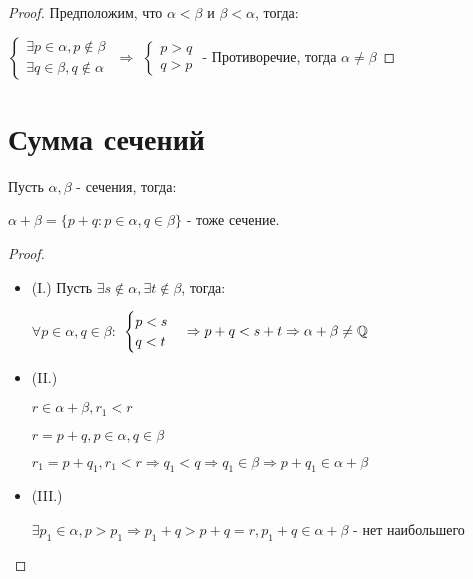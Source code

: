 \begin{proof}
    Предположим, что $\alpha < \beta$ и $\beta < \alpha$, тогда:

    $\begin{cases}
        \exists p \in \alpha, p \notin \beta \\
        \exists q \in \beta, q \notin \alpha  
    \end{cases}$
    $\Rightarrow$
    $\begin{cases}
        p > q \\
        q > p
    \end{cases}$ - Противоречие, тогда $\alpha \neq \beta$
\end{proof}

\section{Сумма сечений}

\begin{theorem}
    Пусть $\alpha, \beta$ - сечения, тогда:

    $\alpha + \beta = \{p + q: p \in \alpha, q \in \beta\}$ - тоже сечение.
\end{theorem}

\begin{proof}
    
    \begin{itemize}
        
        
        \item (I.) Пусть $\exists s \notin \alpha, \exists t \notin \beta$, тогда:

        $\forall p \in \alpha, q \in \beta:$
        $\begin{cases}
            p < s \\
            q < t
        \end{cases} \Rightarrow p + q < s + t \Rightarrow \alpha + \beta \neq \mathbb{Q}$
        \item (II.) 
        
        $r \in \alpha + \beta, r_1 < r$
        
        $r = p + q, p \in \alpha, q \in \beta$

        $r_1 = p + q_1, r_1 < r \Rightarrow q_1 < q \Rightarrow q_1 \in \beta \Rightarrow p + q_1 \in \alpha + \beta$
        \item (III.)
        
        $\exists p_1 \in \alpha, p > p_1 \Rightarrow p_1 + q > p + q = r, p_1 + q \in \alpha + \beta$ - нет наибольшего
    \end{itemize}
\end{proof}

